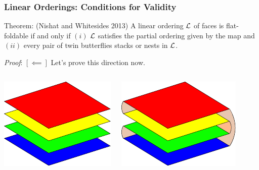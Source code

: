 \documentclass{beamer}
\begin{document}

\begin{frame}
\frametitle{Linear Orderings: Conditions for Validity}

\begin{block}{Theorem: (Nishat and Whitesides 2013)}
A linear ordering $\mathcal{L}$ of faces is flat-foldable if and only if $(i)$ $\mathcal{L}$ satisfies the partial ordering given by the map and $(ii)$ every pair of twin butterflies stacks or nests in $\mathcal{L}$. 
\end{block}

\medskip

\textit{Proof}: $[\impliedby]$ Let's prove this direction now.

\medskip

\begin{columns}[c]

\pause

\includegraphics[width=\textwidth]{sam_images/linear-order-faces.pdf}

\pause

\includegraphics[width=\textwidth]{sam_images/2x2-map-folded.pdf}

\end{columns}

\end{frame}
\end{document}
